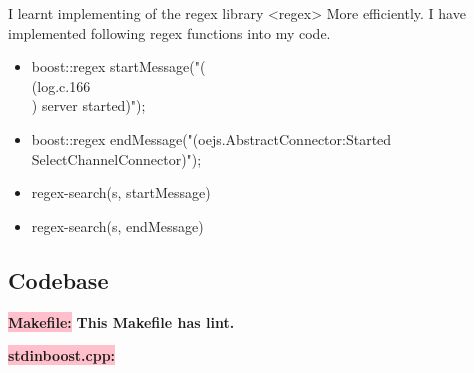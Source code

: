 I learnt implementing of the regex library <regex> More efficiently.\newline
I have implemented following regex functions into my code. \newline
\begin{itemize}
    \item boost::regex startMessage("( \\(log.c.166\\) server started)");
    \item boost::regex endMessage("(oejs.AbstractConnector:Started SelectChannelConnector)");
    \item regex-search(s, startMessage)
   \item  regex-search(s, endMessage)
\end{itemize}

\subsection{Codebase}\label{sec:ps7:code}

\textbf{\colorbox{pink}{Makefile:}} \newline \textbf{This Makefile has lint.}


\textbf{\colorbox{pink}{stdinboost.cpp:}} 






\newpage
